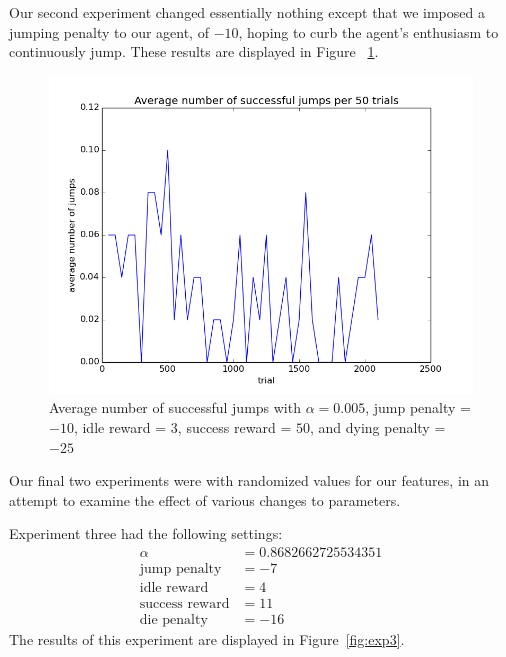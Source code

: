 \documentclass{scrartcl}
\begin{document}
    Our second experiment changed essentially nothing except that we imposed a
    jumping penalty to our agent, of $-10$, hoping to curb the agent's
    enthusiasm to continuously jump. These results are displayed in Figure~
    \ref{fig:exp2}.

    \begin{figure}[H]
        \includegraphics[width=\textwidth]{../avgJumps2}
        \caption{Average number of successful jumps with $\alpha = 0.005$,
        jump penalty = $-10$, idle reward = $3$, success reward = $50$, and
        dying penalty = $-25$}
        \label{fig:exp2}
    \end{figure}

    Our final two experiments were with randomized values for our features, in
    an attempt to examine the effect of various changes to parameters.

    Experiment three had the following settings:
    \begin{align*}
        \alpha &= 0.8682662725534351\\
        \text{jump penalty} &= -7\\
        \text{idle reward} &= 4\\
        \text{success reward} &= 11\\
        \text{die penalty} & = -16
    \end{align*}
    The results of this experiment are displayed in Figure~\ref{fig:exp3}.
\end{document}
